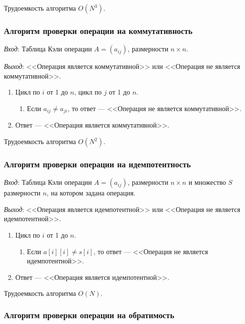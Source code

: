 \documentclass[bachelor, och, labwork]{shiza}
\begin{document}
Трудоемкость алгоритма $O(N^3)$.

\subsubsection{Алгоритм проверки операции на коммутативность}

\textit{Вход}: Таблица Кэли операции $A=(a_{ij})$, размерности $n\times n$.

\textit{Выход}: <<Операция является коммутативной>> или <<Операция не является
коммутативной>>.

\begin{enumerate}
    \item Цикл по $i$ от 1 до $n$, цикл по $j$ от 1 до $n$.
        \begin{enumerate}
            \item Если $a_{ij} \not = a_{ji}$, то ответ --- <<Операция не
            является коммутативной>>.
        \end{enumerate}
    \item Ответ --- <<Операция является коммутативной>>.
\end{enumerate}

Трудоемкость алгоритма $O(N^2)$.

\subsubsection{Алгоритм проверки операции на идемпотентность}

\textit{Вход}: Таблица Кэли операции $A=(a_{ij})$, размерности $n\times n$ и
множество $S$ размерности $n$, на котором задана операция.

\textit{Выход}: <<Операция является идемпотентной>> или <<Операция не является
идемпотентной>>.

\begin{enumerate}
    \item Цикл по $i$ от 1 до $n$.
        \begin{enumerate}
            \item Если $a[i][i] \not= s[i]$, то ответ --- <<Операция не является
            идемпотентной>>.
        \end{enumerate}
    \item Ответ --- <<Операция является идемпотентной>>.
\end{enumerate}

Трудоемкость алгоритма $O(N)$.

\subsubsection{Алгоритм проверки операции на обратимость}
\end{document}
